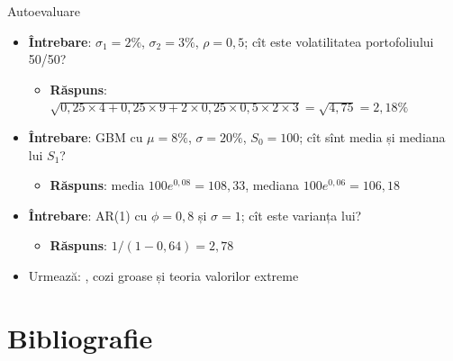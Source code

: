 \begin{frame}{Autoevaluare}
\itemsize{\small}
\begin{itemize}
    \item \textbf{Întrebare}: $\sigma_1 = 2\%$, $\sigma_2 = 3\%$, $\rho = 0{,}5$; cît este volatilitatea portofoliului 50/50?
    \begin{itemize}
        \item \textbf{Răspuns}: $\sqrt{0{,}25 \times 4 + 0{,}25 \times 9 + 2 \times 0{,}25 \times 0{,}5 \times 2 \times 3} = \sqrt{4{,}75} = 2{,}18\%$
    \end{itemize}
    \item \textbf{Întrebare}: GBM cu $\mu = 8\%$, $\sigma = 20\%$, $S_0 = 100$; cît sînt media și mediana lui $S_1$?
    \begin{itemize}
        \item \textbf{Răspuns}: media $100e^{0{,}08} = 108{,}33$, mediana $100e^{0{,}06} = 106{,}18$
    \end{itemize}
    \item \textbf{Întrebare}: AR(1) cu $\phi = 0{,}8$ și $\sigma = 1$; cît este varianța lui?
    \begin{itemize}
        \item \textbf{Răspuns}: $1/(1 - 0{,}64) = 2{,}78$
    \end{itemize}
    \item Urmează: , cozi groase și teoria valorilor extreme
\end{itemize}
\end{frame}


\section{Bibliografie}

